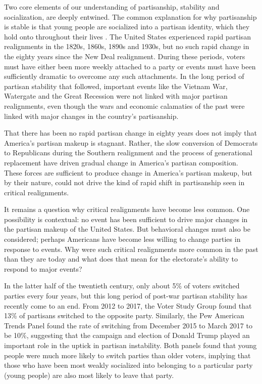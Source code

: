 \documentclass[11pt]{scrartcl}\usepackage[]{graphicx}\usepackage[]{color}
\begin{document}
Two core elements of our understanding of partisanship, stability and socialization, are deeply entwined. The common explanation for why partisanship is stable is that young people are socialized into a partisan identity, which they hold onto throughout their lives \citep{green2004partisan,ghitza2014great}. The United States experienced rapid partisan realignments in the 1820s, 1860s, 1890s and 1930s, but no such rapid change in the eighty years since the New Deal realignment.  During these periods, voters must have either been more weekly attached to a party or events must have been sufficiently dramatic to overcome any such attachments. In the long period of partisan stability that followed, important events like the Vietnam War, Watergate and the Great Recession were not linked with major partisan realignments, even though the wars and economic calamaties of the past were linked with major changes in the country's partisanship. 

That there has been no rapid partisan change in eighty years does not imply that America's partisan makeup is stagnant. Rather, the slow conversion of Democrats to Republicans during the Southern realignment and the process of generational replacement have driven gradual change in America's partisan composition. These forces are sufficient to produce change in America's partisan makeup, but by their nature, could not drive the kind of rapid shift in partisanship seen in critical realignments. 

It remains a question why critical realignments have become less common. One possibility is contextual: no event has been sufficient to drive major changes in the partisan makeup of the United States. But behavioral changes must also be considered; perhaps Americans have become less willing to change parties in response to events.  Why were such critical realignments more common in the past than they are today and what does that mean for the electorate's ability to respond to major events?

In the latter half of the twentieth century, only about 5\% of voters switched parties every four years, but this long period of post-war partisan stability has recently come to an end. From 2012 to 2017, the Voter Study Group found that 13\% of partisans switched to the opposite party. Similarly, the Pew American Trends Panel found the rate of switching from December 2015 to March 2017 to be 10\%, suggesting that the campaign and election of Donald Trump played an important role in the uptick in partisan instability. Both panels found that young people were much more likely to switch parties than older voters, implying that those who have been most weakly socialized into belonging to a particular party (young people) are also most likely to leave that party. 
\end{document}
